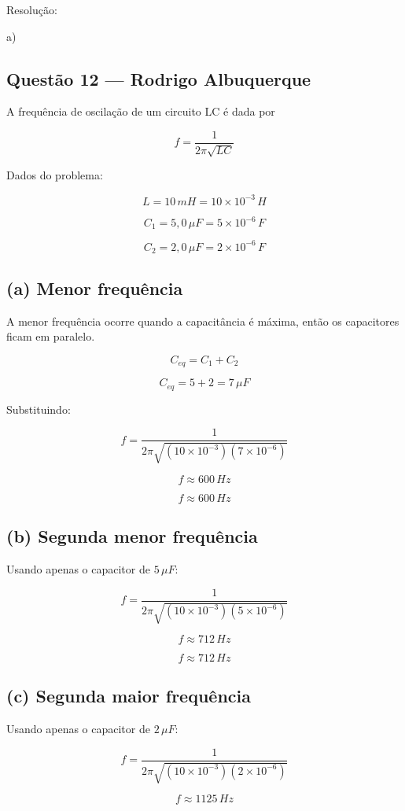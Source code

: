 \documentclass[12pt,a4paper]{article}
\begin{document}
Resolução:


a)

\subsection{Questão 12 — Rodrigo Albuquerque}
A frequência de oscilação de um circuito LC é dada por

\[
f=\frac{1}{2\pi\sqrt{LC}}
\]

Dados do problema:

\[
L=10\,mH=10\times10^{-3}\,H
\]

\[
C_1=5,0\,\mu F=5\times10^{-6}\,F
\]

\[
C_2=2,0\,\mu F=2\times10^{-6}\,F
\]

\subsection*{(a) Menor frequência}

A menor frequência ocorre quando a capacitância é máxima, então os capacitores ficam em paralelo.

\[
C_{eq}=C_1+C_2
\]

\[
C_{eq}=5+2=7\,\mu F
\]

Substituindo:

\[
f=\frac{1}{2\pi\sqrt{(10\times10^{-3})(7\times10^{-6})}}
\]

\[
f\approx600\,Hz
\]

\[
f\approx600\,Hz
\]

\subsection*{(b) Segunda menor frequência}

Usando apenas o capacitor de \(5\,\mu F\):

\[
f=\frac{1}{2\pi\sqrt{(10\times10^{-3})(5\times10^{-6})}}
\]

\[
f\approx712\,Hz
\]

\[
f\approx712\,Hz
\]

\subsection*{(c) Segunda maior frequência}

Usando apenas o capacitor de \(2\,\mu F\):

\[
f=\frac{1}{2\pi\sqrt{(10\times10^{-3})(2\times10^{-6})}}
\]

\[
f\approx1125\,Hz
\]
\end{document}
